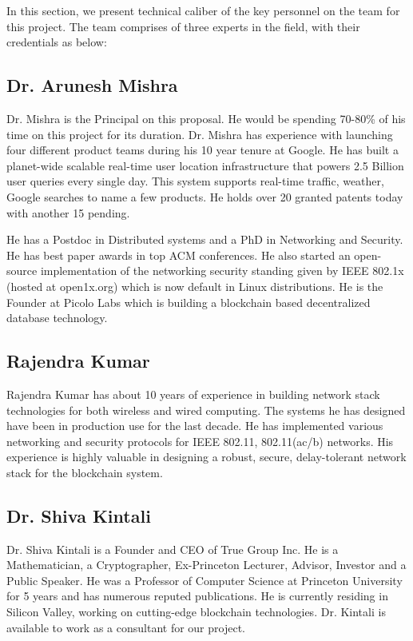 \label{sec:pers}
In this section, we present technical caliber of the key personnel on the team for this project. The team comprises of
three experts in the field, with their credentials as below:

\subsection*{Dr. Arunesh Mishra}

Dr. Mishra is the Principal on this proposal. He would be spending 70-80\% of his time on this project for its duration.
Dr. Mishra has experience with launching four different product teams during his 10 year tenure at Google. He has built
a planet-wide scalable real-time user location infrastructure that powers 2.5 Billion user queries every single day.
This system supports real-time traffic, weather, Google searches to name a few products. He holds over 20 granted
patents today with another 15 pending. 

He has a Postdoc in Distributed systems and a PhD in Networking and Security. He has best paper awards in top ACM
conferences. He also started an open-source implementation of the networking security standing given by IEEE 802.1x
(hosted at open1x.org) which is now default in Linux distributions. He is the Founder at Picolo Labs which is building a
blockchain based decentralized database technology.

\subsection*{Rajendra Kumar}

Rajendra Kumar has about 10 years of experience in building network stack technologies for both wireless and wired
computing. The systems he has designed have been in production use for the last decade. He has implemented various
networking and security protocols for IEEE 802.11, 802.11(ac/b) networks. His experience is highly valuable in designing
a robust, secure, delay-tolerant network stack for the blockchain system.

\subsection*{Dr. Shiva Kintali} 
Dr. Shiva Kintali is a Founder and CEO of True Group Inc. He is a Mathematician, a Cryptographer, Ex-Princeton Lecturer, Advisor,
Investor and a Public Speaker. He was a Professor of Computer Science at Princeton University for 5 years and has
numerous reputed publications. He is currently
residing in Silicon Valley, working on cutting-edge blockchain technologies. Dr. Kintali is available to work as a
consultant for our project.

